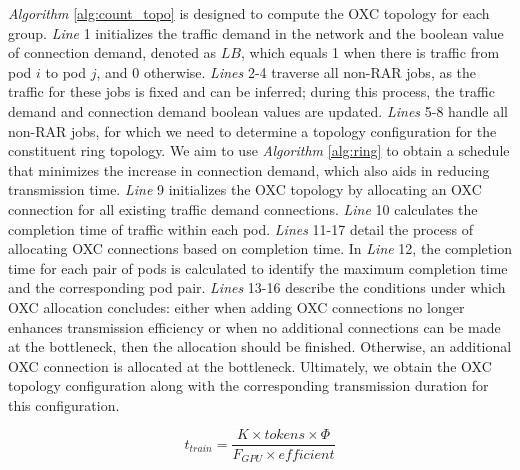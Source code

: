 \documentclass[conference]{IEEEtran}
\begin{document}

\emph{Algorithm} \ref{alg:count_topo} is designed to compute the OXC topology for each group. \emph{Line} 1 initializes the traffic demand in the network and the boolean value of connection demand, denoted as $LB$, which equals 1 when there is traffic from pod \(i\) to pod \(j\), and 0 otherwise. \emph{Lines} 2-4 traverse all non-RAR jobs, as the traffic for these jobs is fixed and can be inferred; during this process, the traffic demand and connection demand boolean values are updated. \emph{Lines} 5-8 handle all non-RAR jobs, for which we need to determine a topology configuration for the constituent ring topology. We aim to use \emph{Algorithm} \ref{alg:ring} to obtain a schedule that minimizes the increase in connection demand, which also aids in reducing transmission time. \emph{Line} 9 initializes the OXC topology by allocating an OXC connection for all existing traffic demand connections. \emph{Line} 10 calculates the completion time of traffic within each pod. \emph{Lines} 11-17 detail the process of allocating OXC connections based on completion time. In \emph{Line} 12, the completion time for each pair of pods is calculated to identify the maximum completion time and the corresponding pod pair. \emph{Lines} 13-16 describe the conditions under which OXC allocation concludes: either when adding OXC connections no longer enhances transmission efficiency or when no additional connections can be made at the bottleneck, then the allocation should be finished. Otherwise, an additional OXC connection is allocated at the bottleneck. Ultimately, we obtain the OXC topology configuration along with the corresponding transmission duration for this configuration.

\begin{equation}
	t_{train} = \dfrac{K \times tokens \times \Phi}{F_{GPU} \times efficient}
\end{equation}
\end{document}
